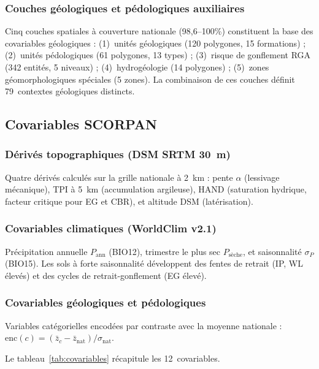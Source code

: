 \documentclass[10pt,a4paper,twocolumn]{article}
\begin{document}
\subsubsection{Couches géologiques et pédologiques auxiliaires}

Cinq couches spatiales à couverture nationale (98{,}6--100\%) constituent
la base des covariables géologiques :
(1)~unités géologiques (120 polygones, 15 formations) ;
(2)~unités pédologiques (61 polygones, 13 types) ;
(3)~risque de gonflement RGA \cite{chassagneux1996} (342 entités, 5 niveaux) ;
(4)~hydrogéologie (14 polygones) ;
(5)~zones géomorphologiques spéciales (5 zones).
La combinaison de ces couches définit 79~contextes géologiques distincts.

\subsection{Covariables SCORPAN}
\label{sec:covariables}

\subsubsection{Dérivés topographiques (DSM SRTM 30~m)}

Quatre dérivés calculés sur la grille nationale à 2~km :
pente $\alpha$ (lessivage mécanique), TPI à 5~km (accumulation argileuse),
HAND (saturation hydrique, facteur critique pour EG et CBR),
et altitude DSM (latérisation).

\subsubsection{Covariables climatiques (WorldClim v2.1)}

Précipitation annuelle $P_{\mathrm{ann}}$ (BIO12), trimestre le plus sec
$P_{\mathrm{sèche}}$, et saisonnalité $\sigma_P$ (BIO15).
Les sols à forte saisonnalité développent des fentes de retrait (IP, WL élevés)
et des cycles de retrait-gonflement (EG élevé).

\subsubsection{Covariables géologiques et pédologiques}

Variables catégorielles encodées par contraste avec la moyenne nationale :
$\mathrm{enc}(c) = (\bar{z}_c - \bar{z}_{\mathrm{nat}})/\sigma_{\mathrm{nat}}$.

Le tableau~\ref{tab:covariables} récapitule les 12~covariables.
\end{document}
